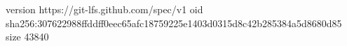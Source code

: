 version https://git-lfs.github.com/spec/v1
oid sha256:307622988ffddff0eec65afc18759225e1403d0315d8c42b285384a5d8680d85
size 43840
